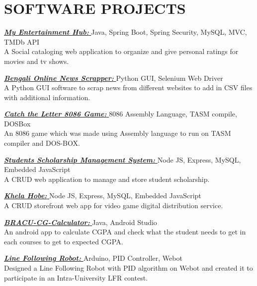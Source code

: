 \documentclass[letterpaper,10.5pt]{article}
\begin{document}
\section{SOFTWARE PROJECTS}
\vspace{-0.5pt}
\begin{itemize}[leftmargin=0in, label={}, parsep=-2pt] {
  \small {
    \item{
                \href{https://github.com/monirulHaque/myentertainmenthub}{\textbf{\emph{\color{NavyBlue} My Entertainment Hub: }}}Java, Spring Boot, Spring Security, MySQL, MVC, TMDb API \\
                A Social cataloging web application to organize and give personal ratings for movies and tv shows.
          }

    \item{
                \href{https://github.com/monirulHaque/Web-Scrappers-for-Thesis}{\textbf{\emph{\color{NavyBlue} Bengali Online News Scrapper: }}}Python GUI, Selenium Web Driver \\
                A Python GUI software to scrap news from different websites to add in CSV files with additional information.
          }


    \item{
                \href{https://github.com/monirulHaque/Catch-The-Letter-8086-game}{\textbf{\emph{\color{NavyBlue}Catch the Letter 8086 Game: }}}8086 Assembly Language, TASM compile, DOSBox \\
                An 8086 game which was made using Assembly language to run on TASM compiler and DOS-BOX.
          }

    \item{
                \href{https://github.com/monirulHaque/student_scholarship}{\textbf{\emph{\color{NavyBlue} Students Scholarship Management System: }}}Node JS, Express, MySQL, Embedded JavaScript \\
                A CRUD web application to manage and store student scholarship.
          }

    \item{
                \href{https://github.com/Khela-Hobe/KhelaHobe}{\textbf{\emph{\color{NavyBlue} Khela Hobe: }}}Node JS, Express, MySQL, Embedded JavaScript \\
                A CRUD storefront web app for video game digital distribution service.
          }
    \item{
                \href{https://github.com/monirulHaque/BRACU-CG-Calculator}{\textbf{\emph{\color{NavyBlue} BRACU-CG-Calculator: }}}Java, Android Studio \\
                An android app to calculate CGPA and check what the student needs to get in each courses to get to expected CGPA.
          }
    \item{
    \href{https://www.youtube.com/watch?v=0LdelP1P-mo}{\textbf{\emph{\color{NavyBlue} Line Following Robot: }}} Arduino, PID Controller, Webot  \\
                Designed a Line Following Robot with PID algorithm on Webot and created it to participate in an Intra-University LFR contest.
    }}
    }




\end{itemize}
\end{document}
